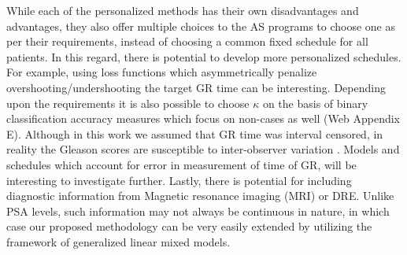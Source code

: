 While each of the personalized methods has their own disadvantages and advantages, they also offer multiple choices to the AS programs to choose one as per their requirements, instead of choosing a common fixed schedule for all patients. In this regard, there is potential to develop more personalized schedules. For example, using loss functions which asymmetrically penalize overshooting/undershooting the target GR time can be interesting. Depending upon the requirements it is also possible to choose $\kappa$ on the basis of binary classification accuracy measures which focus on non-cases as well (Web Appendix E). Although in this work we assumed that GR time was interval censored, in reality the Gleason scores are susceptible to inter-observer variation \citep{Gleason_interobs_var}. Models and schedules which account for error in measurement of time of GR, will be interesting to investigate further. Lastly, there is potential for including diagnostic information from Magnetic resonance imaging (MRI) or DRE. Unlike PSA levels, such information may not always be continuous in nature, in which case our proposed methodology can be very easily extended by utilizing the framework of generalized linear mixed models.